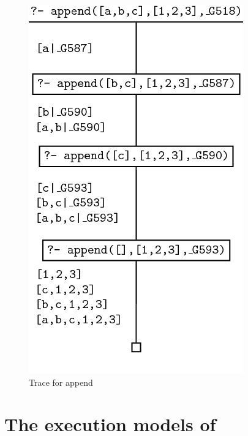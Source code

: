 \documentclass[thesis-solanki.tex]{subfiles}
\begin{document}
\begin{figure}[H]
\centering
\includegraphics[scale = 0.5]{PrologAppendWorking.png}
\caption{Trace for append \cite{webiste:learnprolognowappend}}
\label{fig:Trace for append}
\end{figure}


\section[{The execution models of \progLang{Prolog}}]{The execution models of }\label{sec:exec-models-prolog}
\end{document}
